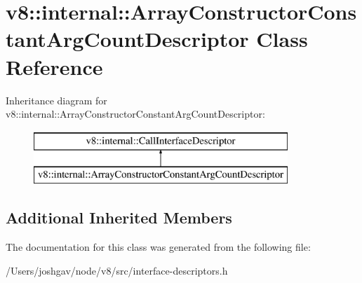 \hypertarget{classv8_1_1internal_1_1_array_constructor_constant_arg_count_descriptor}{}\section{v8\+:\+:internal\+:\+:Array\+Constructor\+Constant\+Arg\+Count\+Descriptor Class Reference}
\label{classv8_1_1internal_1_1_array_constructor_constant_arg_count_descriptor}
Inheritance diagram for v8\+:\+:internal\+:\+:Array\+Constructor\+Constant\+Arg\+Count\+Descriptor\+:\begin{figure}[H]
\begin{center}
\leavevmode
\includegraphics[height=2.000000cm]{classv8_1_1internal_1_1_array_constructor_constant_arg_count_descriptor}
\end{center}
\end{figure}
\subsection*{Additional Inherited Members}


The documentation for this class was generated from the following file\+:\begin{DoxyCompactItemize}
\item 
/\+Users/joshgav/node/v8/src/interface-\/descriptors.\+h\end{DoxyCompactItemize}
